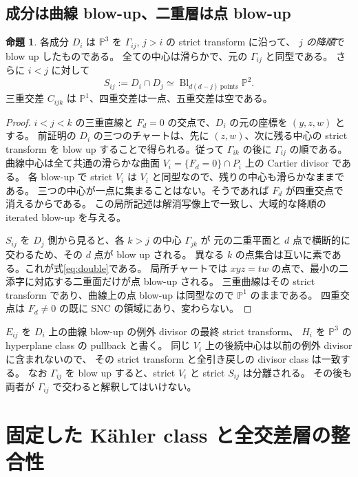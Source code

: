\documentclass[11pt,a4paper]{article}
\theoremstyle{definition}
\newtheorem{proposition}[theorem]{命題}
\newcommand{\PP}{\mathbb P}
\newcommand{\Bl}{\operatorname{Bl}}
\begin{document}
\subsection{成分は曲線 blow-up、二重層は点 blow-up}

\begin{proposition}\label{prop:strata}
各成分 $D_i$ は $\PP^3$ を $\Gamma_{ij}$, $j>i$ の strict transform に沿って、
\emph{$j$ の降順}で blow up したものである。
全ての中心は滑らかで、元の $\Gamma_{ij}$ と同型である。
さらに $i<j$ に対して
\begin{equation}\label{eq:double}
S_{ij}:=D_i\cap D_j\simeq\Bl_{d(d-j)\ \mathrm{points}}\PP^2.
\end{equation}
三重交差 $C_{ijk}$ は $\PP^1$、四重交差は一点、五重交差は空である。
\end{proposition}

\begin{proof}
$i<j<k$ の三重直線と $F_d=0$ の交点で、$D_i$ の元の座標を $(y,z,w)$ とする。
前証明の $D_i$ の三つのチャートは、先に $(z,w)$、次に残る中心の strict transform
を blow up することで得られる。従って $\Gamma_{ik}$ の後に $\Gamma_{ij}$ の順である。
曲線中心は全て共通の滑らかな曲面 $V_i=\{F_d=0\}\cap P_i$ 上の Cartier divisor である。
各 blow-up で strict $V_i$ は $V_i$ と同型なので、残りの中心も滑らかなままである。
三つの中心が一点に集まることはない。そうであれば $F_d$ が四重交点で消えるからである。
この局所記述は解消写像上で一致し、大域的な降順の iterated blow-up を与える。

$S_{ij}$ を $D_j$ 側から見ると、各 $k>j$ の中心 $\Gamma_{jk}$ が
元の二重平面と $d$ 点で横断的に交わるため、その $d$ 点が blow up される。
異なる $k$ の点集合は互いに素である。これが式\eqref{eq:double}である。
局所チャートでは $xyz=tw$ の点で、最小の二添字に対応する二重面だけが点 blow-up される。
三重曲線はその strict transform であり、曲線上の点 blow-up は同型なので $\PP^1$ のままである。
四重交点は $F_d\ne0$ の既に SNC の領域にあり、変わらない。
\end{proof}

$E_{ij}$ を $D_i$ 上の曲線 blow-up の例外 divisor の最終 strict transform、
$H_i$ を $\PP^3$ の hyperplane class の pullback と書く。
同じ $V_i$ 上の後続中心は以前の例外 divisor に含まれないので、
その strict transform と全引き戻しの divisor class は一致する。
なお $\Gamma_{ij}$ を blow up すると、strict $V_i$ と strict $S_{ij}$ は分離される。
その後も両者が $\Gamma_{ij}$ で交わると解釈してはいけない。

\section{固定した Kähler class と全交差層の整合性}\label{sec:kahler}
\end{document}
